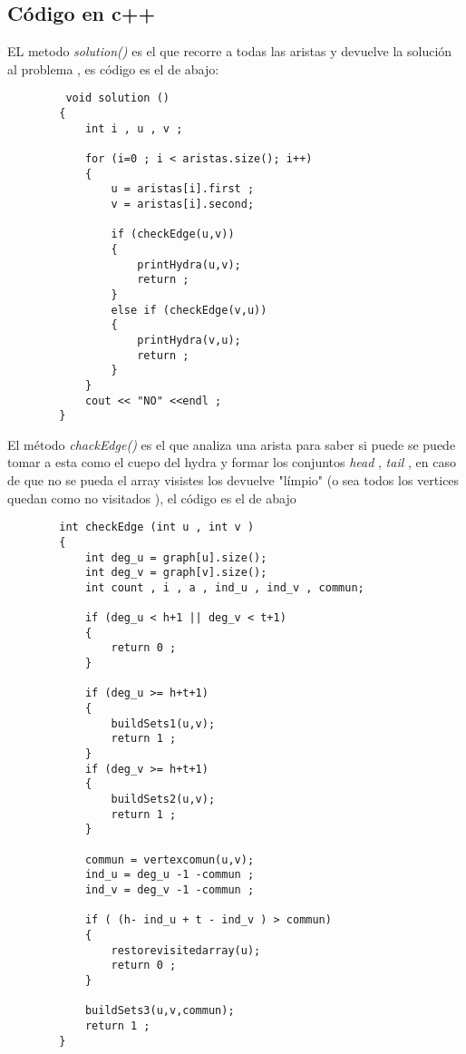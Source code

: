 \documentclass[12pt]{article}
\begin{document}
    \subsection{C\'odigo en c++ }

    \noindent EL metodo \textit{solution()} es el que recorre a todas las aristas y devuelve la soluci\'on al problema , es c\'odigo es el de abajo: 
    \begin{verbatim} 
         void solution ()
        {
            int i , u , v ; 
        
            for (i=0 ; i < aristas.size(); i++) 
            {
                u = aristas[i].first ;
                v = aristas[i].second;

                if (checkEdge(u,v)) 
                {
                    printHydra(u,v);
                    return ; 
                }
                else if (checkEdge(v,u)) 
                {
                    printHydra(v,u);
                    return ;
                }
            }
            cout << "NO" <<endl ; 
        }       
    \end{verbatim}

    \noindent El m\'etodo \textit{chackEdge()} es el que analiza una arista para saber si puede se puede tomar a esta como el cuepo del hydra y formar los conjuntos 
    \textit{head} , \textit{tail} , en caso de que no se pueda el array visistes los devuelve "l\'impio" (o sea todos los vertices quedan como no visitados ), el  c\'odigo es el de abajo

    \begin{verbatim}        
        int checkEdge (int u , int v ) 
        {
            int deg_u = graph[u].size();   
            int deg_v = graph[v].size();    
            int count , i , a , ind_u , ind_v , commun; 
          
            if (deg_u < h+1 || deg_v < t+1)
            {
                return 0 ; 
            }

            if (deg_u >= h+t+1)
            {
                buildSets1(u,v); 
                return 1 ;         
            }
            if (deg_v >= h+t+1)
            {
                buildSets2(u,v);   
                return 1 ;        
            }
        
            commun = vertexcomun(u,v);  
            ind_u = deg_u -1 -commun ;  
            ind_v = deg_v -1 -commun ;  
        
            if ( (h- ind_u + t - ind_v ) > commun) 
            {
                restorevisitedarray(u);  
                return 0 ;      
            }

            buildSets3(u,v,commun); 
            return 1 ;  
        }

    \end{verbatim}
\end{document}

